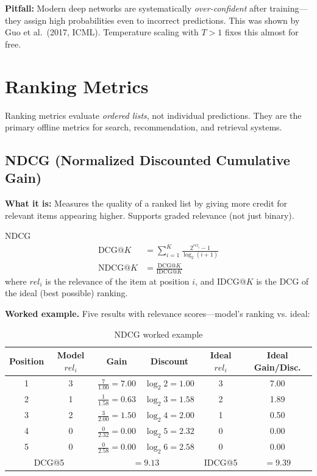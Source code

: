 \textbf{Pitfall:} Modern deep networks are systematically \textit{over-confident} after training---they assign high probabilities even to incorrect predictions. This was shown by Guo et al.\ (2017, ICML). Temperature scaling with $T > 1$ fixes this almost for free.

\section{Ranking Metrics}
\label{sec:ranking_metrics}

Ranking metrics evaluate \textit{ordered lists}, not individual predictions. They are the primary offline metrics for search, recommendation, and retrieval systems.

\subsection{NDCG (Normalized Discounted Cumulative Gain)}

\textbf{What it is:} Measures the quality of a ranked list by giving more credit for relevant items appearing higher. Supports graded relevance (not just binary).

\begin{mathresult}{NDCG}
\begin{align}
\text{DCG}@K &= \sum_{i=1}^{K} \frac{2^{rel_i} - 1}{\log_2(i + 1)} \\[6pt]
\text{NDCG}@K &= \frac{\text{DCG}@K}{\text{IDCG}@K}
\end{align}
where $rel_i$ is the relevance of the item at position $i$, and $\text{IDCG}@K$ is the DCG of the ideal (best possible) ranking.
\end{mathresult}

\textbf{Worked example.} Five results with relevance scores---model's ranking vs. ideal:

\begin{table}[H]
\centering
\caption{NDCG worked example}
\begin{tabular}{cccccc}
\toprule
\textbf{Position} & \textbf{Model $rel_i$} & \textbf{Gain} & \textbf{Discount} & \textbf{Ideal $rel_i$} & \textbf{Ideal Gain/Disc.} \\
\midrule
1 & 3 & $\frac{7}{1.00} = 7.00$ & $\log_2 2 = 1.00$ & 3 & 7.00 \\
2 & 1 & $\frac{1}{1.58} = 0.63$ & $\log_2 3 = 1.58$ & 2 & 1.89 \\
3 & 2 & $\frac{3}{2.00} = 1.50$ & $\log_2 4 = 2.00$ & 1 & 0.50 \\
4 & 0 & $\frac{0}{2.32} = 0.00$ & $\log_2 5 = 2.32$ & 0 & 0.00 \\
5 & 0 & $\frac{0}{2.58} = 0.00$ & $\log_2 6 = 2.58$ & 0 & 0.00 \\
\midrule
\multicolumn{2}{c}{DCG@5} & \multicolumn{2}{c}{$= 9.13$} & IDCG@5 & $= 9.39$ \\
\bottomrule
\end{tabular}
\end{table}

